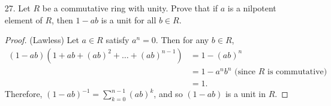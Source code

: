 \documentclass[10pt]{article}
\newcommand{\Z}{\mathbb{Z}}
\begin{document}
\begin{itemize}
\begin{proof}
Let $a + P \neq 0 + P$, and fix $n \in \Z^+$ so that $a^n = a$. Notice
$$(a+P)(a^{n-1}+P) = a^n + P = a+P.$$
Therefore,
\begin{align*}
0 + P &= (a+P)(a^{n-1}+P)-(a+P) \\
&= (a+P)[(a^{n-1}+P)-(1+P)] \\
\end{align*}
Since $P$ is a prime ideal, and we assumed $a+P \neq P$, then $(a^{n-1}+P)-(1+P) = P$. Thus, $a^{n-1}+P = 1 + P$. Therefore $(a+P)(a^{n-2}+P) = 1 + P$. Therefore, $a+P$ is a unit, and so $R/P$ is a field. So $P$ is a maximal ideal. 
\end{proof}


\item[27.] Let $R$ be a commutative ring with unity. Prove that if $a$ is a nilpotent element of $R$, then $1 - ab$ is a unit for all $b \in R$. 

\begin{proof} (Lawless)
Let $a \in R$ satisfy $a^n = 0$. Then for any $b \in R$,
\begin{align*}
(1-ab)(1 + ab + (ab)^2 + \ldots + (ab)^{n-1}) &= 1 - (ab)^n \\
&= 1 - a^nb^n \text{ (since $R$ is commutative) } \\
&= 1.
\end{align*}
Therefore, $(1-ab)^{-1} = \sum_{k=0}^{n-1} (ab)^k$, and so $(1-ab)$ is a unit in $R$. 

\end{proof}


\end{itemize}
\end{document}
